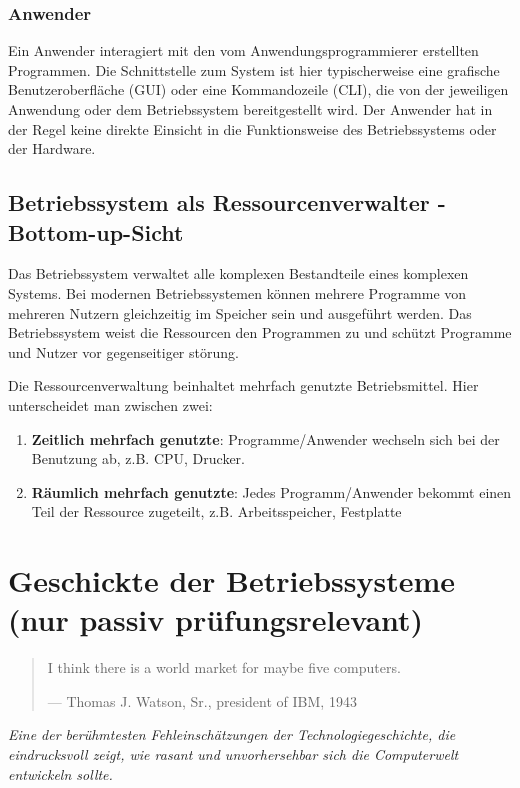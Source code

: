 \subsubsection*{Anwender}
Ein Anwender interagiert mit den vom Anwendungsprogrammierer erstellten Programmen. Die Schnittstelle zum System ist hier typischerweise eine grafische Benutzeroberfläche (GUI) oder eine Kommandozeile (CLI), die von der jeweiligen Anwendung oder dem Betriebssystem bereitgestellt wird. Der Anwender hat in der Regel keine direkte Einsicht in die Funktionsweise des Betriebssystems oder der Hardware.

\subsection{Betriebssystem als Ressourcenverwalter - Bottom-up-Sicht}

Das Betriebssystem verwaltet alle komplexen Bestandteile eines komplexen Systems. Bei modernen Betriebssystemen können mehrere Programme von mehreren Nutzern gleichzeitig im Speicher sein und ausgeführt werden. Das Betriebssystem weist die Ressourcen den Programmen zu und schützt Programme und Nutzer vor gegenseitiger störung.

Die Ressourcenverwaltung beinhaltet mehrfach genutzte Betriebsmittel. Hier unterscheidet man zwischen zwei:

\begin{enumerate}
    \item \textbf{Zeitlich mehrfach genutzte}: Programme/Anwender wechseln sich bei der Benutzung ab, z.B. CPU, Drucker.
    \item \textbf{Räumlich mehrfach genutzte}: Jedes Programm/Anwender bekommt einen Teil der Ressource zugeteilt, z.B. Arbeitsspeicher, Festplatte
\end{enumerate}

\section{Geschickte der Betriebssysteme (nur passiv prüfungsrelevant)}

\begin{quotation}
I think there is a world market for maybe five computers.

\medskip
\noindent
--- Thomas J. Watson, Sr., president of IBM, 1943
\end{quotation}
\textit{Eine der berühmtesten Fehleinschätzungen der Technologiegeschichte, die eindrucksvoll zeigt, wie rasant und unvorhersehbar sich die Computerwelt entwickeln sollte.}


